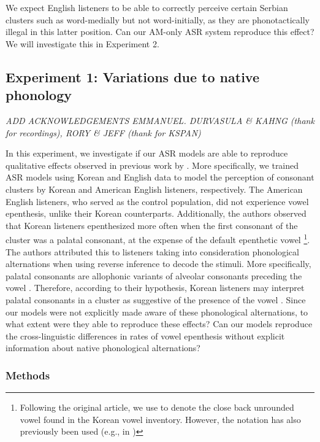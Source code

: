 {We expect English listeners to be able to correctly perceive certain Serbian clusters such as  word-medially but not word-initially, as they are phonotactically illegal in this latter position. Can our AM-only ASR system reproduce this effect? We will investigate this in Experiment 2. 

\subsection{Experiment 1: Variations due to native phonology}
\small{\textit{{\color{red}ADD ACKNOWLEDGEMENTS EMMANUEL. DURVASULA \& KAHNG (thank for recordings), RORY \& JEFF (thank for KSPAN)}}}

In this experiment, we investigate if our ASR models are able to reproduce qualitative effects observed in previous work by \cite{durvasula2015}. More specifically, we trained ASR models using Korean and English data to model the perception of consonant clusters by Korean and American English listeners, respectively. The American English listeners, who served as the control population, did not experience vowel epenthesis, unlike their Korean counterparts. Additionally, the authors observed that Korean listeners epenthesized  more often when the first consonant of the cluster was a palatal consonant, at the expense of the default epenthetic vowel \footnote{Following the original article, we use \textipa{[1]} to denote the close back unrounded vowel found in the Korean vowel inventory. However, the notation \textipa{[W]} has also previously been used (e.g., in \cite{kabak2007})}. The authors attributed this to listeners taking into consideration phonological alternations when using reverse inference to decode the stimuli. More specifically, palatal consonants are allophonic variants of alveolar consonants preceding the vowel . Therefore, according to their hypothesis, Korean listeners may interpret palatal consonants in a cluster as suggestive of the presence of the vowel .   
Since our models were not explicitly made aware of these phonological alternations, to what extent were they able to reproduce these effects? Can our models reproduce the cross-linguistic differences in rates of vowel epenthesis without explicit information about native phonological alternations? 

\subsubsection{Methods}
}
